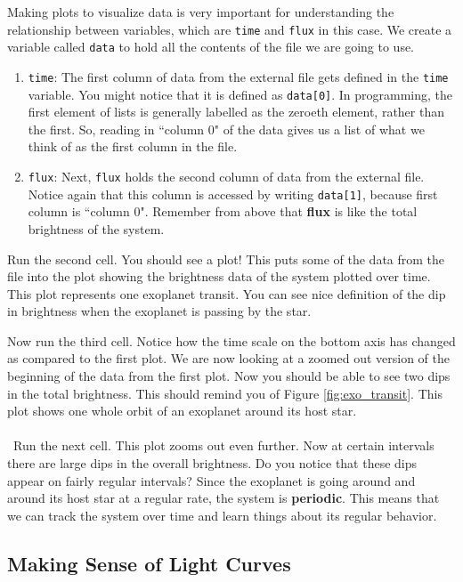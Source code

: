 \documentclass[14pt]{article}
\begin{document}
\noindent Making plots to visualize data is very important for understanding the relationship between variables, which are \texttt{time} and \texttt{flux} in this case. We create a variable called \texttt{data} to hold all the contents of the file we are going to use.

\begin{enumerate}
    \item \texttt{time}: The first column of data from the external file gets defined in the \texttt{time} variable. You might notice that it is defined as \texttt{data[0]}. In programming, the first element of lists is generally labelled as the zeroeth element, rather than the first. So, reading in ``column 0" of the data gives us a list of what we think of as the first column in the file.
    \item \texttt{flux}: Next, \texttt{flux} holds the second column of data from the external file. Notice again that this column is accessed by writing \texttt{data[1]}, because first column is ``column 0". Remember from above that \textbf{flux} is like the total brightness of the system.
\end{enumerate}

\noindent Run the second cell. You should see a plot! This puts some of the data from the file into the plot showing the brightness data of the system plotted over time. This plot represents one exoplanet transit. You can see nice definition of the dip in brightness when the exoplanet is passing by the star.


\noindent Now run the third cell. Notice how the time scale on the bottom axis has changed as compared to the first plot. We are now looking at a zoomed out version of the beginning of the data from the first plot. Now you should be able to see two dips in the total brightness. This should remind you of Figure \ref{fig:exo_transit}. This plot shows one whole orbit of an exoplanet around its host star.
\\\\\
Run the next cell. This plot zooms out even further. Now at certain intervals there are large dips in the overall brightness. Do you notice that these dips appear on fairly regular intervals? Since the exoplanet is going around and around its host star at a regular rate, the system is \textbf{periodic}. This means that we can track the system over time and learn things about its regular behavior.

\subsection*{Making Sense of Light Curves}
\end{document}

